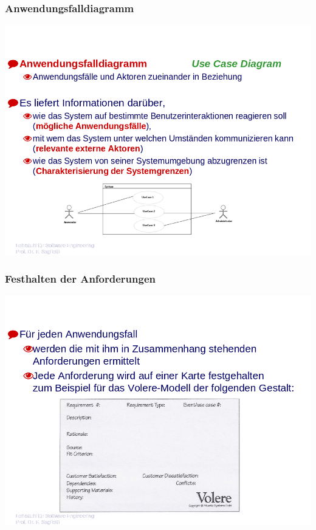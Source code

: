 \subsubsection{Anwendungsfalldiagramm}
\includegraphics[scale=0.5]{./inc/Anforderungsspezifikation/UseCaseDiagram.png}

\subsubsection{Festhalten der Anforderungen}
\includegraphics[scale=0.5]{./inc/Anforderungsspezifikation/Anforderungskarten.png}

